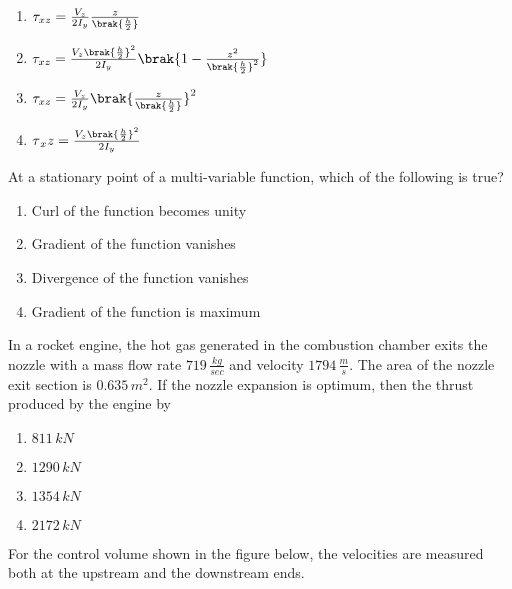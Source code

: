     \begin{enumerate}
        \item $\tau_{xz}=\frac{V_z}{2I_y}\frac{z}{\brak{\frac{h}{2}}}$
        \item $\tau_{xz}=\frac{V_z\brak{\frac{h}{2}}^2}{2I_y}\brak{1-\frac{z^2}{\brak{\frac{h}{2}}^2}}$
        \item $\tau_{xz}=\frac{V_z}{2I_y}\brak{\frac{z}{\brak{\frac{h}{2}}}}^2$
        \item $\tau{_xz}=\frac{V_z\brak{\frac{h}{2}}^2}{2I_y}$
    \end{enumerate}
    \item At a stationary point of a multi-variable function, which of the following is true?
    \begin{enumerate}
        \item Curl of the function becomes unity
        \item Gradient of the function vanishes
        \item Divergence of the function vanishes
        \item Gradient of the function is maximum
    \end{enumerate}
    \item In a rocket engine, the hot gas generated in the combustion chamber exits the nozzle with a mass flow rate $719\,\frac{kg}{sec}$ and velocity $1794\,\frac{m}{s}$. The area of the nozzle exit section is $0.635\,m^2$. If the nozzle expansion is optimum, then the thrust produced by the engine by
        \begin{enumerate}
            \item $811\, kN$
            \item $1290\, kN$
            \item $1354\, kN$
            \item $2172\, kN$
        \end{enumerate}
    \item For the control volume shown in the figure below, the velocities are measured both at the upstream and the downstream ends.

